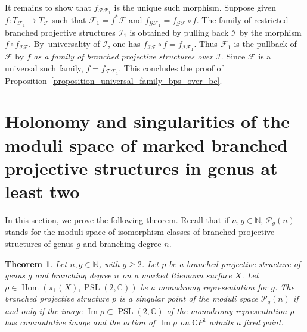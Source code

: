 \documentclass[10pt]{amsart}
\newcommand{\C}{\mathbb C}
\newcommand{\N}{\mathbb N}
\newcommand{\CP}{\mathbb CP}
\DeclareMathOperator{\Hom}{Hom}
\DeclareMathOperator{\Image}{Im}
\DeclareMathOperator{\PSL}{PSL}
\theoremstyle{definition}
\theoremstyle{plain}
\newtheorem{theorem}[definition]{Theorem}
\begin{document}
It remains to show that $f_{\mathcal F \mathcal F_1}$ is the unique such morphism.
Suppose given $f: T_{\mathcal F_1} \to T_{\mathcal F}$ such that $\mathcal F_1 = f^* \mathcal F$ and $f_{\mathcal G \mathcal F_1} = f_{\mathcal G \mathcal F} \circ f$.
The family of restricted branched projective structures $\mathcal I_1$ is obtained by pulling back $\mathcal I$ by the morphism $f \circ f_{\mathcal I \mathcal F}$.
By~universality of $\mathcal I$, one has $f_{\mathcal I \mathcal F} \circ f = f_{\mathcal I \mathcal F_1}$.
Thus $\mathcal F_1$ is the pullback of $\mathcal F$ by $f$ \emph{as a family of branched projective structures over $\mathcal I$}.
Since $\mathcal F$ is a universal such family, $f = f_{\mathcal F \mathcal F_1}$.
This concludes the proof of Proposition~\ref{proposition_universal_family_bps_over_bc}.

\section{Holonomy and singularities of the moduli space of marked branched\texorpdfstring{\newline}{} projective structures in genus at least two}\label{section_singular_points}

In this section, we prove the following theorem. Recall that if $n, g \in \N$, $\mathcal P_g(n)$ stands for the moduli space of isomorphism classes of branched projective structures of genus $g$ and branching degree $n$.

\begin{theorem}\label{theorem_singular_points}
Let $n, g \in \N$, with $g \ge 2$.
Let $p$ be a branched projective structure of genus $g$ and branching degree $n$ on a marked Riemann surface $X$.
Let $\rho \in \Hom(\pi_1(X), \PSL(2, \C))$ be a monodromy representation for $g$.
The branched projective structure $p$ is a singular point of the moduli space $\mathcal P_g(n)$ if and only if the image $\Image \rho \subset \PSL(2, \C)$ of the monodromy representation $\rho$ has commutative image and the action of $\Image \rho$ on $\CP^1$ admits a fixed point.
\end{theorem}
\end{document}

